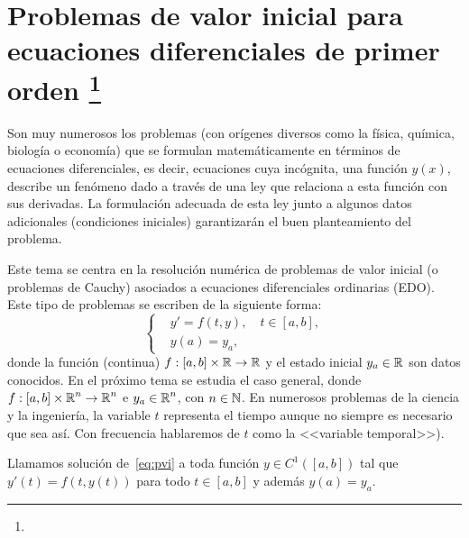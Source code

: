 %
%
\renewcommand{\tt}{t}
\newcommand{\yy}{y}
\newcommand{\yn}{{\yy_n}}
\newcommand{\ynn}{{\yy_{n+1}}}
\newcommand{\ta}{a}
\newcommand{\tb}{b}
\newcommand{\tn}{{\tt_n}}
\newcommand{\tnn}{{\tt_{n+1}}}
\newcommand{\ycero}{{y_a}}
\newcommand{\sol}{y}
\newcommand{\lipschitz}{$y$--Lipschitz\xspace}
\newcommand{\locLipschitz}{localmente $y$--\lipschitz}
\newcommand{\globLipschitz}{\lipschitz}
\newcommand{\RK}{Runge--Kutta}
\newcommand{\AB}{Adams--Bashforth}
\newcommand{\AM}{Adams--Moulton}

\chapter[Problemas de valor inicial para EDOs de primer orden]
{Problemas de valor inicial para ecuaciones diferenciales de primer
  orden%
  \footnote{\licenseInfo}}

Son muy numerosos los problemas (con orígenes diversos como la física,
química, biología o economía) que se formulan matemáticamente en
términos de ecuaciones diferenciales, es decir, ecuaciones cuya
incógnita, una función $y(x)$, describe un fenómeno dado a través de
una ley que relaciona a esta función con sus derivadas. La formulación
adecuada de esta ley junto a algunos datos adicionales (condiciones
iniciales) garantizarán el buen planteamiento del problema.

Este tema se centra en la resolución numérica de problemas de valor
inicial (o problemas de Cauchy) asociados a ecuaciones diferenciales
ordinarias (EDO). Este tipo de problemas se escriben de la siguiente
forma:
\begin{equation}
  \label{eq:pvi}
  \tag{PVI}
  \left\{
  \begin{aligned}
    &y' = f(\tt,\yy), \quad \tt\in[\ta,\tb],
    \\
    &y(\ta) = \ycero,
  \end{aligned}
  \right.
\end{equation}
donde la función (continua) $f:[\ta,\tb]\times\Rset\to\Rset$ y el
estado inicial $\ycero\in\Rset$ son datos conocidos. En el próximo
tema se estudia el caso general, donde
$f:[\ta,\tb]\times\Rset^n\to\Rset^n$ e $\ycero\in\Rset^n$, con
$n\in\operatorname{{\mathbb N}}$. En numerosos problemas de la ciencia y la ingeniería, la
variable $\tt$ representa el tiempo aunque no siempre es necesario que
sea así. Con frecuencia hablaremos de $\tt$ como la <<variable
temporal>>).

\begin{definition}
  Llamamos solución de~\eqref{eq:pvi} a toda función $\sol\in
  C^1([\ta,\tb])$ tal que $\sol'(\tt)=f(\tt,\sol(\tt))$ para todo
  $\tt\in[\ta,\tb]$ y además $\sol(\ta)=\ycero$.\label{def:3}
\end{definition}

